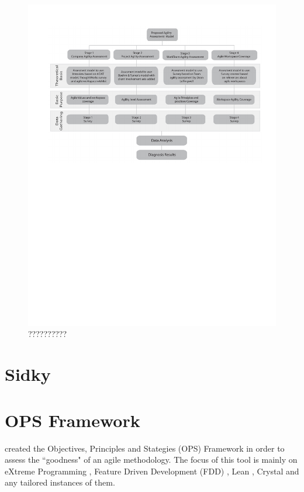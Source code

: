 \begin{figure}
\centerline{\includegraphics[scale=0.9]{include/relatedwork/fig/escobar_model.pdf}}
\caption{??????????} 
\label{??????}
\end{figure}

\section{Sidky}

\section{OPS Framework} %
\citet{sventha_dissertation} created the Objectives, Principles and Stategies (OPS) Framework in order to assess the ``goodness" of an agile methodology. The focus of this tool is mainly on eXtreme Programming \cite{Beck:2004:EPE:1076267}, Feature Driven Development (FDD) \cite{Palmer:2001:PGF:600044}, Lean \cite{Poppendieck:2003:LSD:829556}, Crystal \cite{Cockburn:2004:CCH:1406822} and any tailored instances of them.

